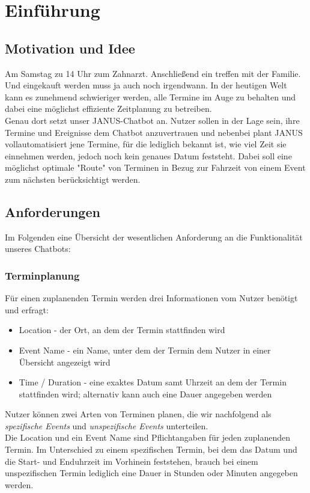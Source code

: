 \chapter{Einführung}
\section{Motivation und Idee}

Am Samstag zu 14 Uhr zum Zahnarzt. Anschließend ein treffen mit der Familie. Und eingekauft werden muss ja auch noch irgendwann. In der heutigen Welt kann es zunehmend schwieriger werden, alle Termine im Auge zu behalten und dabei eine möglichst effiziente Zeitplanung zu betreiben.\\

Genau dort setzt unser JANUS-Chatbot an. Nutzer sollen in der Lage sein, ihre Termine und Ereignisse dem Chatbot anzuvertrauen und nebenbei plant JANUS vollautomatisiert jene Termine, für die lediglich bekannt ist, wie viel Zeit sie einnehmen werden, jedoch noch kein genaues Datum feststeht. Dabei soll eine möglichst optimale "Route" von Terminen in Bezug zur Fahrzeit von einem Event zum nächsten berücksichtigt werden. 


\section{Anforderungen}
Im Folgenden eine Übersicht der wesentlichen Anforderung an die Funktionalität unseres Chatbots:

\subsection{Terminplanung}
Für einen zuplanenden Termin werden drei Informationen vom Nutzer benötigt und erfragt:
\begin{itemize}
	\item Location - der Ort, an dem der Termin stattfinden wird
	\item Event Name - ein Name, unter dem der Termin dem Nutzer in einer Übersicht angezeigt wird
	\item Time / Duration - eine exaktes Datum samt Uhrzeit an dem der Termin stattfinden wird; alternativ kann auch eine Dauer angegeben werden
\end{itemize}
Nutzer können zwei Arten von Terminen planen, die wir nachfolgend als \textit{spezifische Events} und \textit{unspezifische Events} unterteilen.\\
Die Location und ein Event Name sind Pflichtangaben für jeden zuplanenden Termin. Im Unterschied zu einem spezifischen Termin, bei dem das Datum und die Start- und Enduhrzeit im Vorhinein feststehen, brauch bei einem unspezifischen Termin lediglich eine Dauer in Stunden oder Minuten angegeben werden.\\

